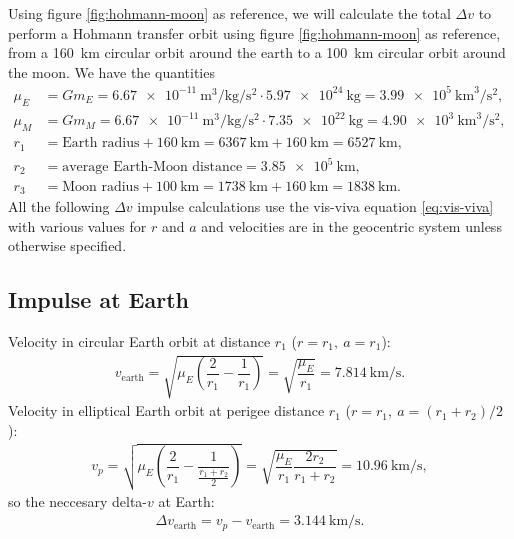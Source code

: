 Using figure \ref{fig:hohmann-moon} as reference, we will calculate the total $\Delta v$ to perform a Hohmann transfer orbit using figure \ref{fig:hohmann-moon} as reference, from a \SI{160}{\km} circular orbit around the earth to a \SI{100}{\km} circular orbit around the moon. We have the quantities \cite{ma}
\begin{align}
\mu_E &= G m_E = \SI[per-mode=fraction]{6.67e-11}{\m\cubed\per\kg\per\s\squared} \cdot \SI{5.97e24}{\kg} = \SI{3.99e5}{\km\cubed\per\s\squared}, \\[0.2cm]
\mu_M &= G m_M = \SI[per-mode=fraction]{6.67e-11}{\m\cubed\per\kg\per\s\squared} \cdot \SI{7.35e22}{\kg} = \SI{4.90e3}{\km\cubed\per\s\squared}, \\[0.2cm]
r_1 &= \text{Earth radius} + \SI{160}{\km} = \SI{6367}{\km}+ \SI{160}{\km} = \SI{6527}{\km}, \\[0.2cm]
r_2 &= \text{average Earth-Moon distance} = \SI{3.85e5}{\km}, \\[0.2cm]
r_3 &= \text{Moon radius} + \SI{100}{\km} = \SI{1738}{\km}+ \SI{160}{\km} = \SI{1838}{\km}.
\end{align}
All the following $\Delta v$ impulse calculations use the vis-viva equation \eqref{eq:vis-viva} with various values for $r$ and $a$ and velocities are in the geocentric system unless otherwise specified.

\subsection{Impulse at Earth}
Velocity in circular Earth orbit at distance $r_1$ ($r = r_1,\ a = r_1$):
\begin{align}
v_{\text{earth}} = \sqrt{\mu_E\left(\dfrac{2}{r_1} - \dfrac{1}{r_1}\right)} = \sqrt{\dfrac{\mu_E}{r_1}} = \SI{7.814}{\km\per\s}. \label{eq:v-earth}
\end{align}
Velocity in elliptical Earth orbit at perigee distance $r_1$ ($r = r_1,\ a = (r_1+r_2)/2$):
\begin{align}
v_p = \sqrt{\mu_E\left(\dfrac{2}{r_1} - \dfrac{1}{\frac{r_1+r_2}{2}}\right)} = \sqrt{\dfrac{\mu_E}{r_1} \dfrac{2 r_2}{r_1+r_2}} = \SI{10.96}{\km\per\s}, \label{eq:vp}
\end{align}
so the neccesary delta-$v$ at Earth:
\begin{align}
\Delta v_{\text{earth}} = v_p - v_{\text{earth}} = \SI{3.144}{\km\per\s}. \label{eq:deltav-earth}
\end{align}
